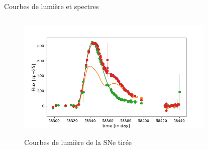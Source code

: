 \documentclass{beamer}
\begin{document}
\begin{frame}{Courbes de lumière et spectres}
\begin{columns}
\begin{column}{.5\textwidth}
\begin{figure}
	\centering
	{\includegraphics[width=.9\textwidth]{figures/26_lc.png}}
	\caption{Courbes de lumière de la SNe tirée}
\end{figure}
\end{column}

\begin{column}{.5\textwidth}
\begin{figure}
	\centering
\end{figure}
\end{column}
\end{columns}
\end{frame}
\end{document}
